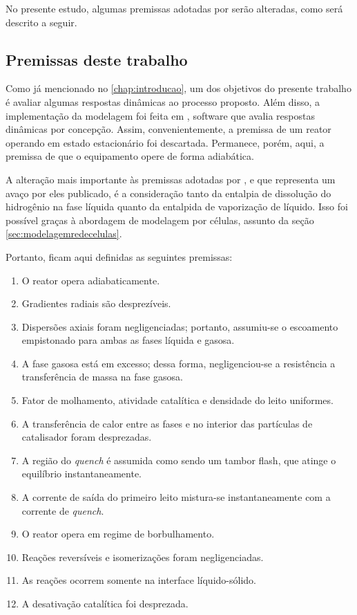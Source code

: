 No presente estudo, algumas premissas adotadas por  serão
alteradas, como será descrito a seguir. 

\subsection{Premissas deste trabalho} \label{sec:premissasdestetrabalho}

Como já mencionado no \autoref{chap:introducao}, um dos objetivos do presente
trabalho é avaliar algumas respostas dinâmicas ao processo proposto. Além disso,
a implementação da modelagem foi feita em \emso, software que avalia respostas
dinâmicas por concepção. Assim, convenientemente, a premissa de um reator
operando em estado estacionário foi descartada. Permanece, porém, aqui, a
premissa de que o equipamento opere de forma adiabática.

A alteração mais importante às premissas adotadas por , e
que representa um avaço por eles publicado, é a consideração tanto da entalpia
de dissolução do hidrogênio na fase líquida quanto da entalpida de vaporização
de líquido. Isso foi possível graças à abordagem de modelagem por células,
assunto da seção \autoref{sec:modelagemredecelulas}.

Portanto, ficam aqui definidas as seguintes premissas:

\begin{enumerate}
  \item O reator opera adiabaticamente.
  \item Gradientes radiais são desprezíveis.
  \item Dispersões axiais foram negligenciadas; portanto, assumiu-se o
  escoamento empistonado para ambas as fases líquida e gasosa.
  \item A fase gasosa está em excesso; dessa forma, negligenciou-se a
  resistência a transferência de massa na fase gasosa.
  \item Fator de molhamento, atividade catalítica e densidade do leito
  uniformes.
  \item A transferência de calor entre as fases e no interior das partículas de
  catalisador foram desprezadas.
  \item A região do \emph{quench} é assumida como sendo um tambor flash, que
  atinge o equilíbrio instantaneamente.
  \item A corrente de saída do primeiro leito mistura-se instantaneamente com a
  corrente de \emph{quench}.
  \item O reator opera em regime de borbulhamento.
  \item Reações reversíveis e isomerizações foram negligenciadas.
  \item As reações ocorrem somente na interface líquido-sólido.
  \item A desativação catalítica foi desprezada.
\end{enumerate}

